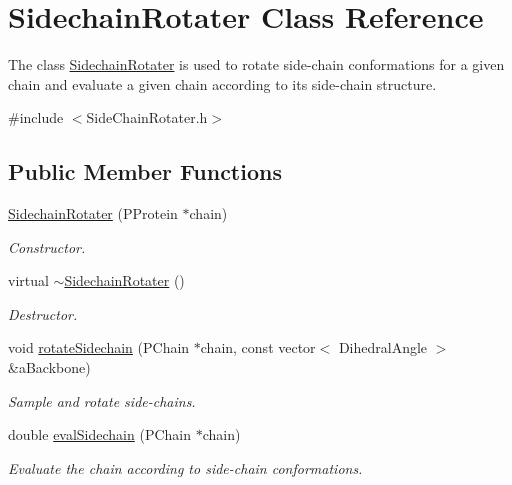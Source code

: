 \hypertarget{classSidechainRotater}{\section{Sidechain\-Rotater Class Reference}
\label{classSidechainRotater}
}


The class \hyperlink{classSidechainRotater}{Sidechain\-Rotater} is used to rotate side-\/chain conformations for a given chain and evaluate a given chain according to its side-\/chain structure.  




{\ttfamily \#include $<$Side\-Chain\-Rotater.\-h$>$}

\subsection*{Public Member Functions}
\begin{DoxyCompactItemize}
\item 
\hyperlink{classSidechainRotater_a1c6c7248459aef075f5025eaaf1884cf}{Sidechain\-Rotater} (P\-Protein $\ast$chain)
\begin{DoxyCompactList}\small\item\em Constructor. \end{DoxyCompactList}\item 
\hypertarget{classSidechainRotater_a2203b921e0064088e8d875b3990c1bdb}{virtual \hyperlink{classSidechainRotater_a2203b921e0064088e8d875b3990c1bdb}{$\sim$\-Sidechain\-Rotater} ()}\label{classSidechainRotater_a2203b921e0064088e8d875b3990c1bdb}

\begin{DoxyCompactList}\small\item\em Destructor. \end{DoxyCompactList}\item 
void \hyperlink{classSidechainRotater_ac1ee6fb7ca4916bee7ce636fdf365a34}{rotate\-Sidechain} (P\-Chain $\ast$chain, const vector$<$ Dihedral\-Angle $>$ \&a\-Backbone)
\begin{DoxyCompactList}\small\item\em Sample and rotate side-\/chains. \end{DoxyCompactList}\item 
double \hyperlink{classSidechainRotater_a70b676fec39124ff681392115cf58667}{eval\-Sidechain} (P\-Chain $\ast$chain)
\begin{DoxyCompactList}\small\item\em Evaluate the chain according to side-\/chain conformations. \end{DoxyCompactList}\end{DoxyCompactItemize}
